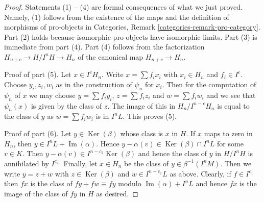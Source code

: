 \documentclass[10pt,a4paper]{amsart}
\theoremstyle{plain}
\theoremstyle{definition}
\theoremstyle{remark}
\numberwithin{equation}{subsection}
\def\Ker{\mathop{\mathrm{Ker}}}
\def\Im{\mathop{\mathrm{Im}}}
\begin{document}
\begin{proof}
\medskip\noindent
Statements (1) -- (4) are formal consequences of what we just proved.
Namely, (1) follows from the existence of the maps and the definition
of morphisms of pro-objects in
Categories, Remark \ref{categories-remark-pro-category}.
Part (2) holds because isomorphic pro-objects have isomorphic limits.
Part (3) is immediate from part (4).
Part (4) follows from the factorization
$H_{n + c} \to H/I^nH \to H_n$ of the canonical map
$H_{n + c} \to H_n$.

\medskip\noindent
Proof of part (5). Let $x \in I^cH_n$. Write $x = \sum f_i x_i$ with
$x_i \in H_n$ and $f_i \in I^c$. Choose $y_i, z_i, w_i$ as in the
construction of $\psi_n$ for $x_i$. Then for the computation of
$\psi_n$ of $x$ we may choose
$y = \sum f_iy_i$, $z = \sum f_i z_i$ and $w = \sum f_i w_i$
and we see that $\psi_n(x)$ is given by the class of $z$.
The image of this in $H_n/I^{n - c}H_n$ is equal to the class
of $y$ as $w = \sum f_i w_i$ is in $I^nL$. This proves (5).

\medskip\noindent
Proof of part (6). Let $y \in \Ker(\beta)$ whose class is $x$ in $H$.
If $x$ maps to zero in $H_n$, then $y \in I^nL + \Im(\alpha)$.
Hence $y - \alpha(v) \in \Ker(\beta) \cap I^nL$ for some $v \in K$.
Then $y - \alpha(v) \in I^{n - c_2}\Ker(\beta)$ and hence the class
of $y$ in $H/I^nH$ is annihilated by $I^{c_2}$. Finally, let $x \in H_n$
be the class of $y \in \beta^{-1}(I^nM)$. Then we write $y = z + w$
with $z \in \Ker(\beta)$ and $w \in I^{n - c_1}L$ as above. Clearly, if
$f \in I^{c_1}$ then $fx$ is the class of
$fy + fw \equiv fy$ modulo $\Im(\alpha) + I^nL$ and hence $fx$ is
the image of the class of $fy$ in $H$ as desired.
\end{proof}
\end{document}
